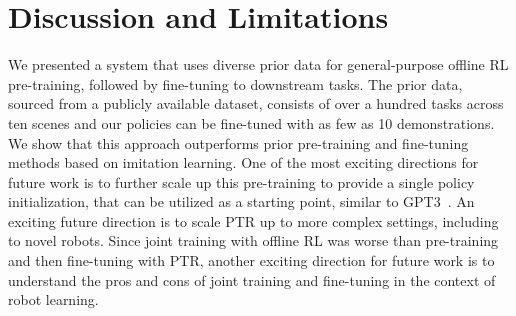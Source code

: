 \documentclass[../thesis.tex]{subfiles}
\begin{document}
% 








\section{Discussion and Limitations}
\label{sec:conclusion}
We presented a system that uses diverse prior data for general-purpose offline RL pre-training, followed by fine-tuning to downstream tasks. The prior data, sourced from a publicly available dataset, consists of over a hundred tasks across ten scenes and our policies can be fine-tuned with as few as 10 demonstrations. We show that this approach outperforms prior pre-training and fine-tuning methods based on imitation learning. One of the most exciting directions for future work is to further scale up this pre-training to provide a single policy initialization, that can be utilized as a starting point, similar to GPT3~\citep{brown2020language}. 
An exciting future direction is to scale PTR up to more complex settings, including to novel robots. {Since joint training with offline RL was worse than pre-training and then fine-tuning with PTR, another exciting direction for future work is to understand the pros and cons of joint training and fine-tuning in the context of robot learning.}
\end{document}
